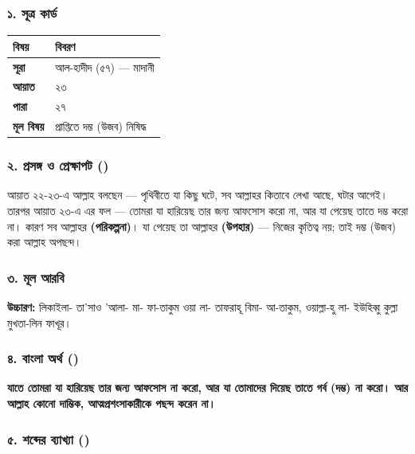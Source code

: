 \subsubsection*{১. সূত্র কার্ড}

\begin{table}[h]\centering\small
\begin{tabular}{ll}
বিষয় & বিবরণ \\
\hline
\textbf{সূরা} & আল-হাদীদ (৫৭) — মাদানী \\
\textbf{আয়াত} & ২৩ \\
\textbf{পারা} & ২৭ \\
\textbf{মূল বিষয়} & প্রাপ্তিতে দম্ভ (উজব) নিষিদ্ধ \\
\hline
\end{tabular}
\end{table}

\subsubsection*{২. প্রসঙ্গ ও প্রেক্ষাপট ()}

আয়াত ২২-২৩-এ আল্লাহ বলছেন — পৃথিবীতে যা কিছু ঘটে, সব আল্লাহর কিতাবে লেখা আছে, ঘটার আগেই। তারপর আয়াত ২৩-এ এর ফল — তোমরা যা হারিয়েছ তার জন্য আফসোস করো না, আর যা পেয়েছ তাতে দম্ভ করো না। কারণ সব আল্লাহর \textbf{ (পরিকল্পনা)}। যা পেয়েছ তা আল্লাহর \textbf{ (উপহার)} — নিজের কৃতিত্ব নয়; তাই দম্ভ (উজব) করা আল্লাহ অপছন্দ।

\subsubsection*{৩. মূল আরবি}
\begin{center}\end{center}
\textbf{উচ্চারণ:} লিকাইলা- তা'সাও 'আলা- মা- ফা-তাকুম ওয়া লা- তাফরাহূ বিমা- আ-তাকুম, ওয়াল্লা-হু লা- ইউহিব্বু কুল্লা মুখতা-লিন ফাখূর।

\subsubsection*{৪. বাংলা অর্থ ()}
\textbf{যাতে তোমরা যা হারিয়েছ তার জন্য আফসোস না করো, আর যা তোমাদের দিয়েছ তাতে গর্ব (দম্ভ) না করো। আর আল্লাহ কোনো দাম্ভিক, আত্মপ্রশংসাকারীকে পছন্দ করেন না।}

\subsubsection*{৫. শব্দের ব্যাখ্যা ()}

